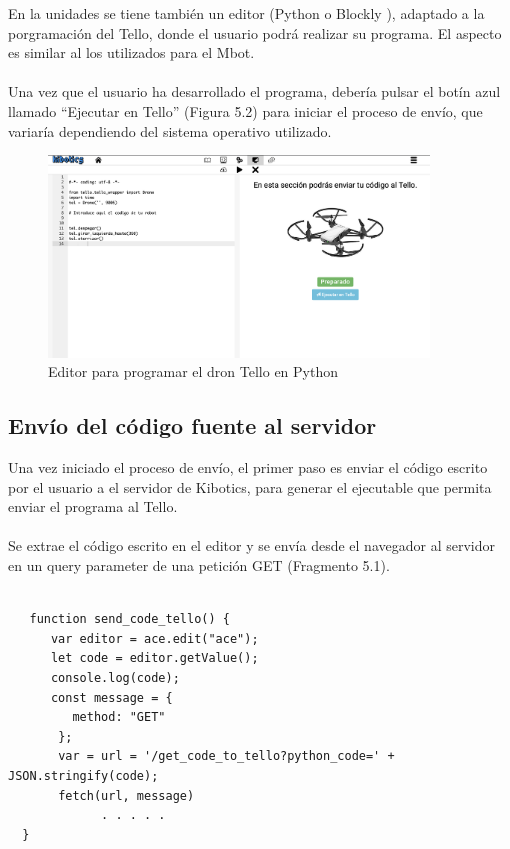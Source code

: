 \documentclass{report}
\begin{document}
En la unidades se tiene también un editor (Python o Blockly ), adaptado a la porgramación del Tello, donde el usuario podrá realizar su programa. El aspecto es similar al los utilizados para el Mbot. 
\\
\\
Una vez que el usuario ha desarrollado el programa, debería pulsar el botín azul llamado “Ejecutar en Tello” (Figura 5.2) para iniciar el proceso de envío, que variaría dependiendo del sistema operativo utilizado.
\\
\begin{figure}[h!]
  \centering
    \includegraphics[width=0.9\textwidth]{images/editor_tello.png}
  \caption{Editor para programar el dron Tello en Python}
  \label{Editor para programar el dron Tello en Python}
\end{figure}


\subsection{Envío del código fuente al servidor}

Una vez iniciado el proceso de envío, el primer paso es enviar el código escrito por el usuario a el servidor de Kibotics, para generar el ejecutable que permita enviar el programa al Tello. 
\\
\\
Se extrae el código escrito en el editor y se envía desde el navegador al servidor en un query parameter de una petición GET (Fragmento 5.1).
\\
\begin{lstlisting}[frame=single,breaklines=true, label=Envio del programa desde el navegador al servidor", caption=Envio del programa desde el navegador al servidor,captionpos=b]
   
   function send_code_tello() {
      var editor = ace.edit("ace");
      let code = editor.getValue();
      console.log(code);
      const message = {
         method: "GET"
       };
       var = url = '/get_code_to_tello?python_code=' + JSON.stringify(code);
       fetch(url, message)
             . . . . .
  }
\end{lstlisting}
\end{document}
